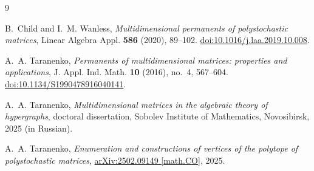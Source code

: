 \documentclass[11pt]{amsart}
\theoremstyle{remark}
\begin{document}
\begin{thebibliography}{9}

B.~Child and I.~M. Wanless,
\emph{Multidimensional permanents of polystochastic matrices},
Linear Algebra Appl. \textbf{586} (2020), 89--102.
\href{https://doi.org/10.1016/j.laa.2019.10.008}
{doi:10.1016/j.laa.2019.10.008}.

A.~A. Taranenko,
\emph{Permanents of multidimensional matrices: properties and applications},
J. Appl. Ind. Math. \textbf{10} (2016), no.~4, 567--604.
\href{https://doi.org/10.1134/S1990478916040141}
{doi:10.1134/S1990478916040141}.

A.~A. Taranenko,
\emph{Multidimensional matrices in the algebraic theory of hypergraphs},
doctoral dissertation, Sobolev Institute of Mathematics, Novosibirsk, 2025
(in Russian).

A.~A. Taranenko,
\emph{Enumeration and constructions of vertices of the polytope of
polystochastic matrices},
\href{https://arxiv.org/abs/2502.09149}
{arXiv:2502.09149 [math.CO]}, 2025.

\end{thebibliography}
\end{document}

